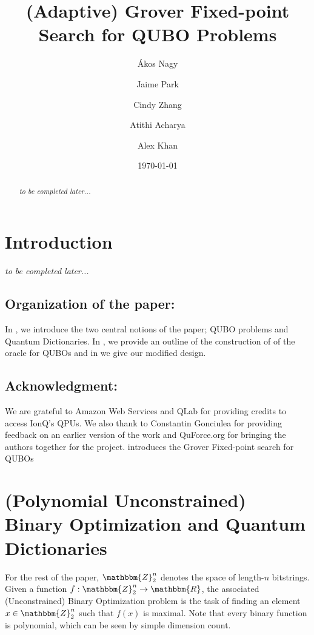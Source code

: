 \documentclass[reqno,10pt]{amsart}
\title{(Adaptive) Grover Fixed-point Search for QUBO Problems}
\date{\today}
\author{\'Akos Nagy}
\author{Jaime Park}
\author{Cindy Zhang}
\author{Atithi Acharya}
\author{Alex Khan}
\numberwithin{equation}{section}                %
\def\rl{\mathbbm{R}}
\def\Z{\mathbbm{Z}}
\begin{document}
\begin{abstract}
   \emph{to be completed later...}
\end{abstract}

\maketitle

\section{Introduction}

\emph{to be completed later...}

\smallskip

\subsection*{Organization of the paper:} In , we introduce the two central notions of the paper; QUBO problems and Quantum Dictionaries. In , we provide an outline of the construction of \cite{gilliam_grover_2021} of the oracle for QUBOs and in  we give our modified design.

\smallskip

\subsection*{Acknowledgment:} We are grateful to Amazon Web Services and QLab for providing credits to access IonQ's QPUs. We also thank to Constantin Gonciulea for providing feedback on an earlier version of the work and QuForce.org for bringing the authors together for the project.  introduces the Grover Fixed-point search for QUBOs

\bigskip

\section{(Polynomial Unconstrained) Binary Optimization and Quantum Dictionaries}
\label{sec:qubos_and_qdicts}

For the rest of the paper, $\Z_2^n$ denotes the space of length-$n$ bitstrings. Given a function $f : \Z_2^n \rightarrow \rl$, the associated (Unconstrained) Binary Optimization problem is the task of finding an element $x \in \Z_2^n$ such that $f (x)$ is maximal. Note that every binary function is polynomial, which can be seen by simple dimension count.
\end{document}
